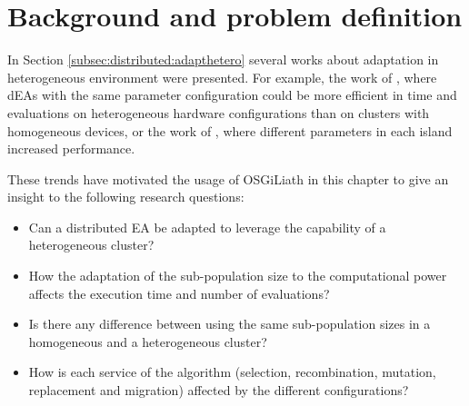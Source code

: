 
\section{Background and problem definition}
In Section \ref{subsec:distributed:adapthetero} several works about adaptation in heterogeneous environment were presented. For example, the work of , where dEAs with the same parameter configuration could be more efficient in time and evaluations on heterogeneous hardware configurations than on clusters with homogeneous devices, or the work of , where different parameters in each island increased performance.

 These trends have motivated the usage of OSGiLiath in this chapter to give an insight to the following research questions:
\begin{itemize}
 \item Can a distributed EA be adapted to leverage the capability of a
   heterogeneous cluster?  %
 \item How the adaptation of the sub-population size to the
   computational power affects the execution time and number of
   evaluations?  %
 \item Is there any difference between using the same sub-population sizes in a homogeneous and a heterogeneous cluster?
 \item How is each service of the algorithm (selection, recombination, mutation, replacement and migration) affected by the different
   configurations?  %
\end{itemize}

